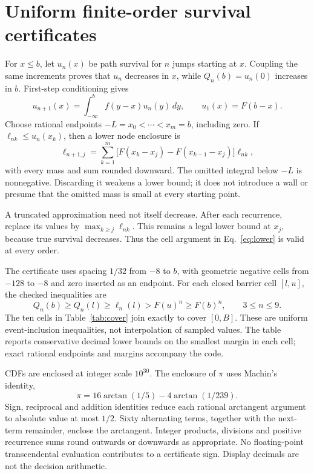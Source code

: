 \documentclass[11pt]{article}
\begin{document}
\section{Uniform finite-order survival certificates}
For $x\le b$, let $u_n(x)$ be path survival for $n$ jumps starting at $x$.
Coupling the same increments proves that $u_n$ decreases in $x$, while
$Q_n(b)=u_n(0)$ increases in $b$. First-step conditioning gives
\begin{equation}\label{eq:kernel}
 u_{n+1}(x)=\int_{-\infty}^b f(y-x)u_n(y)\,dy,\qquad
 u_1(x)=F(b-x).
\end{equation}
Choose rational endpoints $-L=x_0<\cdots<x_m=b$, including zero.
If $\ell_{nk}\le u_n(x_k)$, then a lower node enclosure is
\begin{equation}\label{eq:lower}
 \ell_{n+1,j}=\sum_{k=1}^m
 \bigl[F(x_k-x_j)-F(x_{k-1}-x_j)\bigr]\ell_{nk},
\end{equation}
with every mass and sum rounded downward. The omitted integral below $-L$
is nonnegative. Discarding it weakens a lower bound; it does not introduce a
wall or presume that the omitted mass is small at every starting point.

A truncated approximation need not itself decrease. After each recurrence,
replace its values by $\max_{k\ge j}\ell_{nk}$. This remains a legal lower
bound at $x_j$, because true survival decreases. Thus the cell argument in
Eq.~\eqref{eq:lower} is valid at every order.

The certificate uses spacing $1/32$ from $-8$ to $b$, with geometric
negative cells from $-128$ to $-8$ and zero inserted as an endpoint.
For each closed barrier cell $[l,u]$, the checked inequalities are
\begin{equation}\label{eq:cell}
 Q_n(b)\ge Q_n(l)\ge\ell_n(l)>F(u)^n\ge F(b)^n,
 \qquad 3\le n\le9.
\end{equation}
The ten cells in Table~\ref{tab:cover} join exactly to cover $[0,B]$.
These are uniform event-inclusion inequalities, not interpolation of sampled
values. The table reports conservative decimal lower bounds on the smallest
margin in each cell; exact rational endpoints and margins accompany the code.


CDFs are enclosed at integer scale $10^{30}$. The enclosure of $\pi$ uses
Machin's identity,
\begin{equation}
\pi=16\arctan(1/5)-4\arctan(1/239).
\end{equation}
Sign, reciprocal and addition identities reduce each rational arctangent
argument to absolute value at most $1/2$. Sixty alternating terms, together
with the next-term remainder, enclose the arctangent. Integer products,
divisions and positive recurrence sums round outwards or downwards as
appropriate. No floating-point transcendental evaluation contributes to a
certificate sign. Display decimals are not the decision arithmetic.
\end{document}
